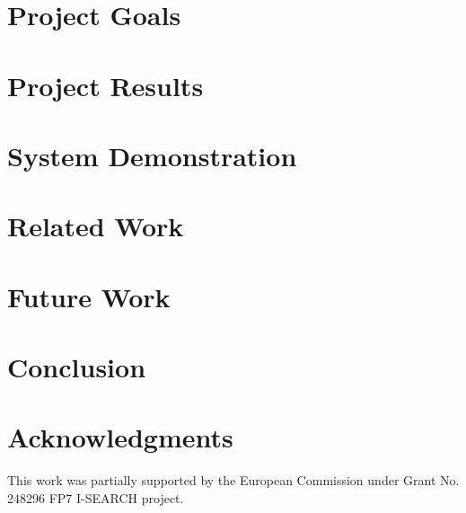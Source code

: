 \documentclass{acm_proc_article-sp}
\newcommand{\inlinelistingsize}{\fontsize{8pt}{11pt}}
\let\oldttdefault\ttdefault
\renewcommand{\ttdefault}{pcr}
\let\oldurl\url
\renewcommand{\url}[1]{\inlinelistingsize\oldurl{#1}}
\begin{document}
\section{Project Goals}

\section{Project Results}

\section{System Demonstration}

\section{Related Work}

\section{Future Work}

\section{Conclusion}

\section{Acknowledgments}
This work was partially supported by the European Commission under Grant No. 248296 FP7 \mbox{I-SEARCH} project.

\let\ttdefault\oldttdefault
\let\url\oldurl




\balancecolumns
\end{document}
